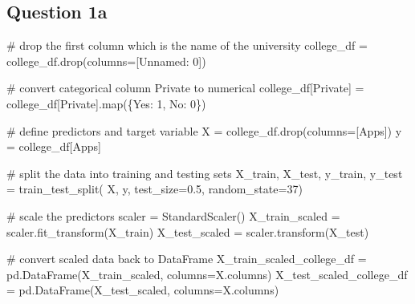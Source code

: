 \documentclass[
  letterpaper,
  DIV=11,
  numbers=noendperiod]{scrartcl}
\newenvironment{Shaded}{\begin{snugshade}}{\end{snugshade}}
\newcommand{\BuiltInTok}[1]{\textcolor[rgb]{0.00,0.23,0.31}{#1}}
\newcommand{\CommentTok}[1]{\textcolor[rgb]{0.37,0.37,0.37}{#1}}
\newcommand{\DecValTok}[1]{\textcolor[rgb]{0.68,0.00,0.00}{#1}}
\newcommand{\FloatTok}[1]{\textcolor[rgb]{0.68,0.00,0.00}{#1}}
\newcommand{\NormalTok}[1]{\textcolor[rgb]{0.00,0.23,0.31}{#1}}
\newcommand{\OperatorTok}[1]{\textcolor[rgb]{0.37,0.37,0.37}{#1}}
\newcommand{\StringTok}[1]{\textcolor[rgb]{0.13,0.47,0.30}{#1}}
\begin{document}
\subsection{Question 1a}\label{question-1a}

\begin{Shaded}
\begin{Highlighting}[]
\CommentTok{\# drop the first column which is the name of the university}
\NormalTok{college\_df }\OperatorTok{=}\NormalTok{ college\_df.drop(columns}\OperatorTok{=}\NormalTok{[}\StringTok{\textquotesingle{}Unnamed: 0\textquotesingle{}}\NormalTok{])}

\CommentTok{\# convert categorical column \textquotesingle{}Private\textquotesingle{} to numerical}
\NormalTok{college\_df[}\StringTok{\textquotesingle{}Private\textquotesingle{}}\NormalTok{] }\OperatorTok{=}\NormalTok{ college\_df[}\StringTok{\textquotesingle{}Private\textquotesingle{}}\NormalTok{].}\BuiltInTok{map}\NormalTok{(\{}\StringTok{\textquotesingle{}Yes\textquotesingle{}}\NormalTok{: }\DecValTok{1}\NormalTok{, }\StringTok{\textquotesingle{}No\textquotesingle{}}\NormalTok{: }\DecValTok{0}\NormalTok{\})}

\CommentTok{\# define predictors and target variable}
\NormalTok{X }\OperatorTok{=}\NormalTok{ college\_df.drop(columns}\OperatorTok{=}\NormalTok{[}\StringTok{\textquotesingle{}Apps\textquotesingle{}}\NormalTok{])}
\NormalTok{y }\OperatorTok{=}\NormalTok{ college\_df[}\StringTok{\textquotesingle{}Apps\textquotesingle{}}\NormalTok{]}

\CommentTok{\# split the data into training and testing sets}
\NormalTok{X\_train, X\_test, y\_train, y\_test }\OperatorTok{=}\NormalTok{ train\_test\_split(}
\NormalTok{    X, y, test\_size}\OperatorTok{=}\FloatTok{0.5}\NormalTok{, random\_state}\OperatorTok{=}\DecValTok{37}\NormalTok{)}

\CommentTok{\# scale the predictors}
\NormalTok{scaler }\OperatorTok{=}\NormalTok{ StandardScaler()}
\NormalTok{X\_train\_scaled }\OperatorTok{=}\NormalTok{ scaler.fit\_transform(X\_train)}
\NormalTok{X\_test\_scaled }\OperatorTok{=}\NormalTok{ scaler.transform(X\_test)}

\CommentTok{\# convert scaled data back to DataFrame}
\NormalTok{X\_train\_scaled\_college\_df }\OperatorTok{=}\NormalTok{ pd.DataFrame(X\_train\_scaled, columns}\OperatorTok{=}\NormalTok{X.columns)}
\NormalTok{X\_test\_scaled\_college\_df }\OperatorTok{=}\NormalTok{ pd.DataFrame(X\_test\_scaled, columns}\OperatorTok{=}\NormalTok{X.columns)}
\end{Highlighting}
\end{Shaded}
\end{document}
